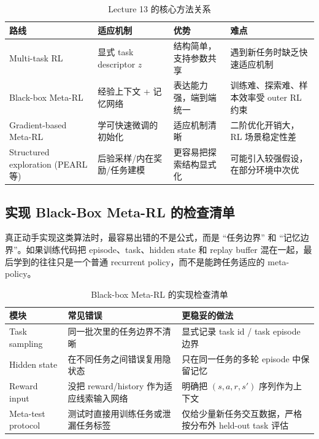 \documentclass[a4paper]{article}
\begin{document}
\begin{table}[H]
\centering
\begin{tabular}{p{} p{} p{} p{}}
\toprule
路线 & 适应机制 & 优势 & 难点 \\
\midrule
Multi-task RL & 显式 task descriptor $z$ & 结构简单，支持参数共享 & 遇到新任务时缺乏快速适应机制 \\
Black-box Meta-RL & 经验上下文 + 记忆网络 & 表达能力强，端到端统一 & 训练难、探索难、样本效率受 outer RL 约束 \\
Gradient-based Meta-RL & 学可快速微调的初始化 & 适应机制清晰 & 二阶优化开销大，RL 场景稳定性差 \\
Structured exploration (PEARL 等) & 后验采样/内在奖励/任务建模 & 更容易把探索结构显式化 & 可能引入较强假设，在部分环境中次优 \\
\bottomrule
\end{tabular}
\caption{Lecture 13 的核心方法关系}
\end{table}

\subsection{实现 Black-Box Meta-RL 的检查清单}

真正动手实现这类算法时，最容易出错的不是公式，而是 ``任务边界'' 和 ``记忆边界''。如果训练代码把 episode、task、hidden state 和 replay buffer 混在一起，最后学到的往往只是一个普通 recurrent policy，而不是能跨任务适应的 meta-policy。

\begin{table}[H]
\centering
\begin{tabular}{p{} p{} p{}}
\toprule
模块 & 常见错误 & 更稳妥的做法 \\
\midrule
Task sampling & 同一批次里的任务边界不清晰 & 显式记录 task id / task episode 边界 \\
Hidden state & 在不同任务之间错误复用隐状态 & 只在同一任务的多轮 episode 中保留记忆 \\
Reward input & 没把 reward/history 作为适应线索输入网络 & 明确把 $(s,a,r,s')$ 序列作为上下文 \\
Meta-test protocol & 测试时直接用训练任务或泄漏任务标签 & 仅给少量新任务交互数据，严格按分布外 held-out task 评估 \\
\bottomrule
\end{tabular}
\caption{Black-box Meta-RL 的实现检查清单}
\end{table}
\end{document}
